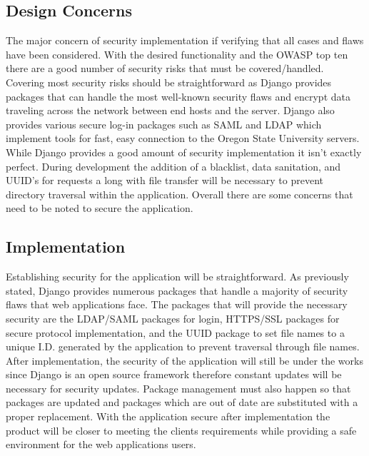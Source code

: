 \documentclass[onecolumn, draftclsnofoot,10pt, compsoc]{IEEEtran}
\begin{document}
\subsection{Design Concerns}
The major concern of security implementation if verifying that all cases and flaws have been considered. With the desired functionality and the OWASP top ten there are a good number of security risks that must be covered/handled. Covering most security risks should be straightforward as Django provides packages that can handle the most well-known security flaws and encrypt data traveling across the network between end hosts and the server. Django also provides various secure log-in packages such as SAML and LDAP which implement tools for fast, easy connection to the Oregon State University servers. While Django provides a good amount of security implementation it isn’t exactly perfect. During development the addition of a blacklist, data sanitation, and UUID's for requests a long with file transfer will be necessary to prevent directory traversal within the application. Overall there are some concerns that need to be noted to secure the application. 

\subsection{Implementation}
Establishing security for the application will be straightforward. As previously stated, Django provides numerous packages that handle a majority of security flaws that web applications face. The packages that will provide the necessary security are the LDAP/SAML packages for login, HTTPS/SSL packages for secure protocol implementation, and the UUID package to set file names to a unique I.D. generated by the application to prevent traversal through file names. After implementation, the security of the application will still be under the works since Django is an open source framework therefore constant updates will be necessary for security updates. Package management must also happen so that packages are updated and packages which are out of date are substituted with a proper replacement. With the application secure after implementation the product will be closer to meeting the clients requirements while providing a safe environment for the web applications users.  
\end{document}
